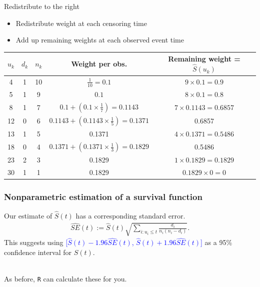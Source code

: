 \documentclass[10pt,t]{beamer}
\begin{document}
\begin{frame}{Redistribute to the right}
\begin{itemize}
	\item Redistribute weight at each censoring time
	\item Add up remaining weights at each observed event time
\end{itemize}
		\begin{footnotesize}
		\begin{tabular}{|c|c|c|c|c|}
			\hline
				$u_k$ & $d_k$ & $n_k$ & Weight per obs. & Remaining weight = $\widehat{S}(u_k)$ \\
			\hline
			4 & 1 & 10 & $\frac{1}{10} = 0.1$ & $9\times 0.1= 0.9$\\
			5 & 1 & 9 & $0.1$ &  $8\times 0.1= 0.8$  \\
			8 & 1 & 7 & $0.1 + (0.1\times \frac{1}{7}) = 0.1143$ & $7 \times 0.1143 = 0.6857$\\
			12 & 0 & 6 & $0.1143 +  (0.1143\times\frac{1}{5}) = 0.1371$ &  0.6857\\
			13 & 1 & 5 & 0.1371 & $4 \times 0.1371 =0.5486 $\\
			18 & 0 & 4 & $0.1371 + (0.1371\times \frac{1}{3}) = 0.1829$ & 0.5486\\
			23 & 2 & 3 & 0.1829&  $1 \times 0.1829 = 0.1829$\\
			30 & 1 & 1 & 0.1829 & $0.1829 \times 0 = 0$\\
			\hline
		\end{tabular}
	\end{footnotesize}
\end{frame}

\begin{frame}
\frametitle{Nonparametric estimation of a survival function}

Our estimate of $\widehat{S}(t)$ has a corresponding standard error. 
\begin{align*}
\widehat{SE}(t) := \widehat{S}(t)\sqrt{\sum_{i : u_i \leq t}\frac{d_i}{n_i(n_i - d_i)}}.
\end{align*}
This suggests using 
\textcolor{blue}{[$\widehat{S}(t) - 1.96 \widehat{SE}(t)$, $\widehat{S}(t) + 1.96 \widehat{SE}(t)$]} as a 95\% confidence interval for $S(t)$.
\\ ~\ 

As before, \texttt{R} can calculate these for you.
\end{frame}
\end{document}
